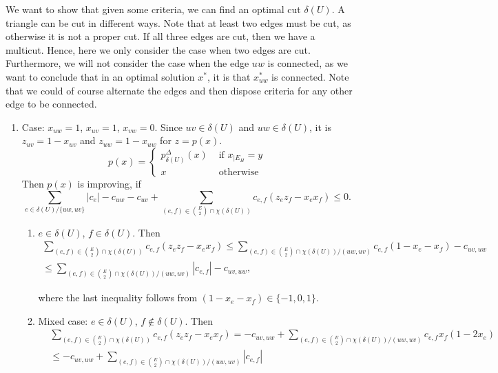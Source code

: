 We want to show that given some criteria, we can find an optimal cut $\delta(U)$. A triangle can be cut in different ways. Note that at least two edges must be cut, as otherwise it is not a proper cut. If all three edges are cut, then we have a multicut. Hence, here we only consider the case when two edges are cut. 
Furthermore, we will not consider the case when the edge $uw$ is connected, as we want to conclude that in an optimal solution $x^*$, it is that $x^*_{uw}$ is connected. 
Note that we could of course alternate the edges and then dispose criteria for any other edge to be connected. 
 \begin{enumerate}
 \item Case: $x_{uw}=1$, $x_{uv}=1$, $x_{vw}=0$. Since $uv \in \delta(U)$ and $uw \in \delta(U)$, it is $z_{uv}=1-x_{uv}$ and $z_{uw}=1-x_{uw}$ for $z=p(x)$. 
 \[ p(x)= \begin{cases}
    p_{\delta(U)}^{\Delta} (x)  & \text{ if } x_{|E_H} =y \\
    x & \text{ otherwise } 
\end{cases} \]
 Then $p(x)$ is improving, if 
 \begin{equation*}
 \sum_{e \in \delta(U)/ \{uw, uv \}} |c_e| - c_{uw} -c_{uv} + \sum_{ (e,f) \in {E \choose 2} \cap \chi(\delta(U))} c_{e,f} (z_e z_f - x_e x_f) \leq 0. 
 \end{equation*}
\begin{enumerate}
 \item $e \in \delta(U)$, $f \in \delta(U)$. 
 Then  
 \begin{align}
 \sum_{ (e,f) \in {E \choose 2} \cap \chi(\delta(U)) } c_{e,f} (z_e z_f - x_e x_f)  \leq  \sum_{ (e,f) \in {E \choose 2} \cap \chi(\delta(U))  / (uw, uv)} c_{e,f} (1 - x_e- x_f) -c_{uv,uw} & \\  \leq \sum_{ (e,f) \in {E \choose 2} \cap \chi(\delta(U))  / (uw, uv)} |c_{e,f}| -c_{uv,uw},
 \end{align}

where the last inequality follows from $(1-x_e - x_f) \in \{-1,0,1\}$.
\item Mixed case: $e \in \delta(U)$, $f \notin \delta(U)$. Then 
\begin{align}
& \sum_{ (e,f) \in {E \choose 2} \cap \chi(\delta(U)) } c_{e,f} (z_e z_f - x_e x_f)  = - c_{uv,uw} +  \sum_{ (e,f) \in {E \choose 2} \cap \chi(\delta(U))  / (uw, uv)} c_{e,f} x_f (1-2x_e) \\
& \leq - c_{uv,uw} +  \sum_{ (e,f) \in {E \choose 2} \cap \chi(\delta(U))  / (uw, uv)} |c_{e,f}| 
\end{align}


\end{enumerate}
\end{enumerate}
